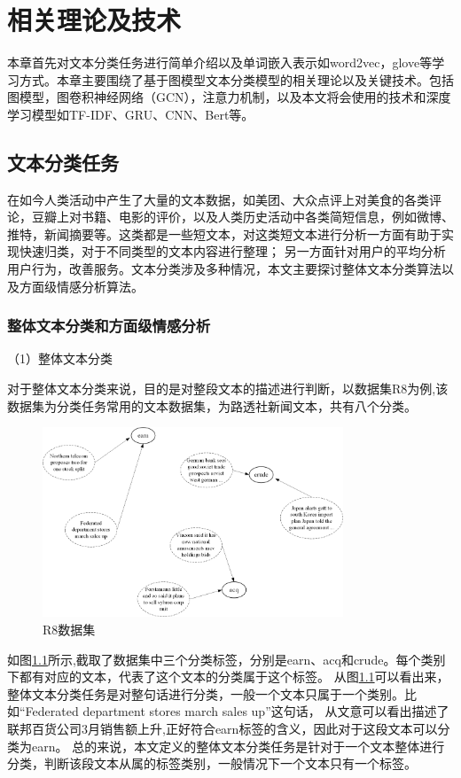 \chapter{相关理论及技术}
本章首先对文本分类任务进行简单介绍以及单词嵌入表示如word2vec，glove等学习方式。本章主要围绕了基于图模型文本分类模型的相关理论以及关键技术。包括图模型，图卷积神经网络（GCN），注意力机制，以及本文将会使用的技术和深度学习模型如TF-IDF、GRU、CNN、Bert等。
\section{文本分类任务}
在如今人类活动中产生了大量的文本数据，如美团、大众点评上对美食的各类评论，豆瓣上对书籍、电影的评价，以及人类历史活动中各类简短信息，例如微博、推特，新闻摘要等。这类都是一些短文本，对这类短文本进行分析一方面有助于实现快速归类，对于不同类型的文本内容进行整理；
另一方面针对用户的平均分析用户行为，改善服务。文本分类涉及多种情况，本文主要探讨整体文本分类算法以及方面级情感分析算法。
\subsection{整体文本分类和方面级情感分析}
（1）整体文本分类

对于整体文本分类来说，目的是对整段文本的描述进行判断，以数据集R8为例,该数据集为分类任务常用的文本数据集，为路透社新闻文本，共有八个分类。

\begin{figure}[htb]%
	\setlength{\belowcaptionskip}{0pt}
	\centering
	\includegraphics[width=0.8\textwidth]{pic/2-1.png}
	\caption{R8数据集}
	\label{R8datasets}
\end{figure}
如图\ref{R8datasets}所示,截取了数据集中三个分类标签，分别是earn、acq和crude。每个类别下都有对应的文本，代表了这个文本的分类属于这个标签。
从图\ref{R8datasets}可以看出来，整体文本分类任务是对整句话进行分类，一般一个文本只属于一个类别。比如“Federated department stores march sales up”这句话，
从文意可以看出描述了联邦百货公司3月销售额上升,正好符合earn标签的含义，因此对于这段文本可以分类为earn。
总的来说，本文定义的整体文本分类任务是针对于一个文本整体进行分类，判断该段文本从属的标签类别，一般情况下一个文本只有一个标签。

